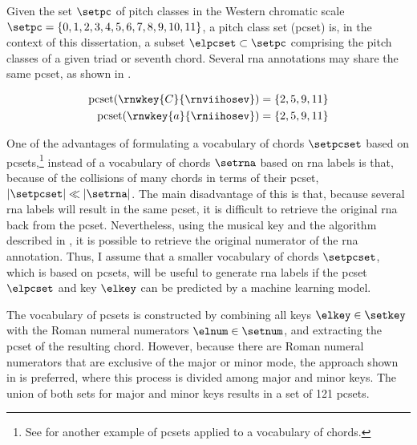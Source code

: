 
Given the set $\setpc$ of pitch classes in the Western
chromatic scale $\setpc = \{0, 1, 2, 3, 4, 5, 6, 7, 8, 9,
10, 11 \}$, a pitch class set (\gls{pcset}) is, in the
context of this dissertation, a subset $\elpcset \subset
\setpc$ comprising the pitch classes of a given triad or
seventh chord. Several \gls{rna} annotations may share the
same \gls{pcset}, as shown in .

\begin{equation}
    \label{eq:pcset_collision}
    \begin{split}
        \text{pcset}(\rnwkey{C}{\rnviihosev}) &= \{2, 5, 9, 11 \}\\
        \text{pcset}(\rnwkey{a}{\rniihosev}) &= \{2, 5, 9, 11 \}
    \end{split}
\end{equation}

One of the advantages of formulating a vocabulary of chords
$\setpcset$ based on \gls{pcset}s,\footnote{See
\textcite{rohrmeier2008statistical} for another example of
\gls{pcset}s applied to a vocabulary of chords.} instead of a
vocabulary of chords $\setrna$ based on \gls{rna} labels is
that, because of the collisions of many chords in terms of
their \gls{pcset}, $| \setpcset | \ll | \setrna |$. The main
disadvantage of this is that, because several \gls{rna}
labels will result in the same \gls{pcset}, it is difficult
to retrieve the original \gls{rna} back from the
\gls{pcset}. Nevertheless, using the musical key and the
algorithm described in
, it is
possible to retrieve the original numerator of the \gls{rna}
annotation. Thus, I assume that a smaller vocabulary of
chords $\setpcset$, which is based on \gls{pcset}s, will be
useful to generate \gls{rna} labels if the \gls{pcset}
$\elpcset$ and key $\elkey$ can be predicted by a machine
learning model.

The vocabulary of \gls{pcset}s is constructed by combining
all keys $\elkey \in \setkey$ with the Roman numeral
numerators $\elnum \in \setnum$, and extracting the
\gls{pcset} of the resulting chord. However, because there
are Roman numeral numerators that are exclusive of the major
or minor mode, the approach shown in  is
preferred, where this process is divided among major and
minor keys. The union of both sets for major and minor keys
results in a set of 121 \gls{pcset}s.


